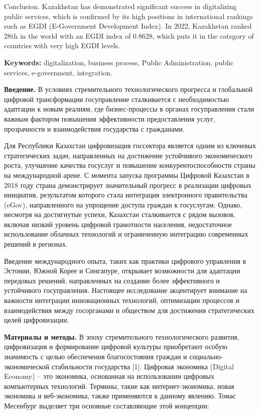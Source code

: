 {Conclusion. Kazakhstan has demonstrated significant success in
digitalizing public services, which is confirmed by its high positions
in international rankings such as EGDI (E-Government Development Index).
In 2022, Kazakhstan ranked 28th in the world with an EGDI index of
0.8628, which puts it in the category of countries with very high EGDI
levels.

{\bfseries Keywords:} digitalization, business process, Public
Administration, public services, e-government, integration.

{\bfseries Введение.} В условиях стремительного технологического прогресса
и глобальной цифровой трансформации госуправление сталкивается с
необходимостью адаптации к новым реалиям, где бизнес-процессы в органах
госуправления стали важным фактором повышения эффективности
предоставления услуг, прозрачности и взаимодействия государства с
гражданами.

Для Республики Казахстан цифровизация госсектора является одним из
ключевых стратегических задач, направленных на достижение устойчивого
экономического роста, улучшение качества госуслуг и повышение
конкурентоспособности страны на международной арене. С момента запуска
программы Цифровой Казахстан в 2018 году страна демонстрирует
значительный прогресс в реализации цифровых инициатив, результатом
которого стала интеграция электронного правительства (eGov),
направленного на упрощение доступа граждан к госуслугам. Однако,
несмотря на достигнутые успехи, Казахстан сталкивается с рядом вызовов,
включая низкий уровень цифровой грамотности населения, недостаточное
использование облачных технологий и ограниченную интеграцию современных
решений в регионах.

Введение международного опыта, таких как практики цифрового управления в
Эстонии, Южной Корее и Сингапуре, открывает возможности для адаптации
передовых решений, направленных на создание более эффективного и
устойчивого госуправления. Настоящее исследование акцентирует внимание
на важности интеграции инновационных технологий, оптимизации процессов и
взаимодействия между госорганами и обществом для достижения
стратегических целей цифровизации.

{\bfseries Материалы и методы.} В эпоху стремительного технологического
развития, цифровизация и формирование цифровой культуры приобретают
особую значимость с целью обеспечения благосостояния граждан и
социально-экономической стабильности государства {[}1{]}. Цифровая
экономика (Digital Economy) -- это экономика, основанная на
использовании цифровых компьютерных технологий. Термины, такие как
интернет-экономика, новая экономика и веб-экономика, также применяются к
данному явлению. Томас Месенбург выделяет три основные составляющие этой
концепции:

}
